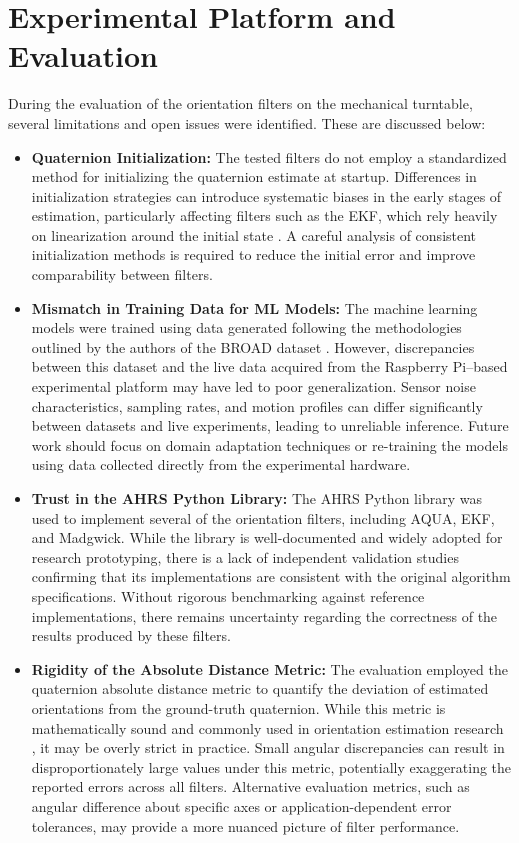 \documentclass{iutbscthesis}
\begin{document}
\section{Experimental Platform and Evaluation}

During the evaluation of the orientation filters on the mechanical turntable, several limitations and open issues were identified. These are discussed below:

\begin{itemize}
    \item \textbf{Quaternion Initialization:} The tested filters do not employ a standardized method for initializing the quaternion estimate at startup. Differences in initialization strategies can introduce systematic biases in the early stages of estimation, particularly affecting filters such as the EKF, which rely heavily on linearization around the initial state \cite{maybeck1982stochastic}. A careful analysis of consistent initialization methods is required to reduce the initial error and improve comparability between filters.
    
    \item \textbf{Mismatch in Training Data for ML Models:} The machine learning models were trained using data generated following the methodologies outlined by the authors of the BROAD dataset \cite{BROAD}. However, discrepancies between this dataset and the live data acquired from the Raspberry Pi–based experimental platform may have led to poor generalization. Sensor noise characteristics, sampling rates, and motion profiles can differ significantly between datasets and live experiments, leading to unreliable inference. Future work should focus on domain adaptation techniques or re-training the models using data collected directly from the experimental hardware.
    
    \item \textbf{Trust in the AHRS Python Library:} The AHRS Python library \cite{ahrs_doc} was used to implement several of the orientation filters, including AQUA, EKF, and Madgwick. While the library is well-documented and widely adopted for research prototyping, there is a lack of independent validation studies confirming that its implementations are consistent with the original algorithm specifications. Without rigorous benchmarking against reference implementations, there remains uncertainty regarding the correctness of the results produced by these filters.
    
    \item \textbf{Rigidity of the Absolute Distance Metric:} The evaluation employed the quaternion absolute distance metric to quantify the deviation of estimated orientations from the ground-truth quaternion. While this metric is mathematically sound and commonly used in orientation estimation research \cite{markley2007quaternion}, it may be overly strict in practice. Small angular discrepancies can result in disproportionately large values under this metric, potentially exaggerating the reported errors across all filters. Alternative evaluation metrics, such as angular difference about specific axes or application-dependent error tolerances, may provide a more nuanced picture of filter performance.
\end{itemize}
\end{document}
